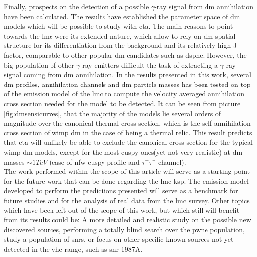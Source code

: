 \documentclass{article}
\begin{document}
Finally, prospects on the detection of a possible $\gamma$-ray signal from \gls{dm} annihilation have been calculated. The results have established the parameter space of \gls{dm} models which will be possible to study with \gls{cta}. The main reasons to point towards the \gls{lmc} were its extended nature, which allow to rely on \gls{dm} spatial structure for its differentiation from the background and its relatively high J-factor, comparable to other popular \gls{dm} candidates such as \gls{dsphe}. However, the big population of other $\gamma$-ray emitters difficult the task of extracting a $\gamma$-ray signal coming from \gls{dm} annihilation. In the results presented in this work, several \gls{dm} profiles, annihilation channels and \gls{dm} particle masses has been tested on top of the emission model of the \gls{lmc} to compute the velocity averaged annihilation cross section needed for the model to be detected. It can be seen from picture \ref{fig:dmsensicurves}, that the majority of the models lie several orders of magnitude over the canonical thermal cross section, which is the self-annihilation cross section of \gls{wimp} \gls{dm} in the case of being a thermal relic. This result predicts that \gls{cta} will unlikely be able to exclude the canonical cross section for the typical \gls{wimp} \gls{dm} models, except for the most cuspy ones(yet not very realistic) at \gls{dm} masses $\sim 1 TeV$ (case of nfw-cuspy profile and $\tau^+ \tau^-$ channel).\\

The work performed within the scope of this article will serve as a starting point for the future work that can be done regarding the \gls{lmc} \gls{ksp}. The emission model developed to perform the predictions presented will serve as a benchmark for future studies and for the analysis of real data from the \gls{lmc} survey.
Other topics which have been left out of the scope of this work, but which still will benefit from its results could be: A more detailed and realistic study on the possible new discovered sources, performing a totally blind search over the \gls{pwne} population, study a population of \glspl{snr}, or focus on other specific known sources not yet detected in the \gls{vhe} range, such as \gls{snr} 1987A.

\printbibliography
\end{document}
